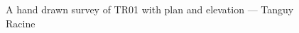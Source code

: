 \begin{figure}[t!]
\centering
{}
\caption{A hand drawn survey of TR01 with plan and elevation --- Tanguy Racine}
\label{scan}
\end{figure}

